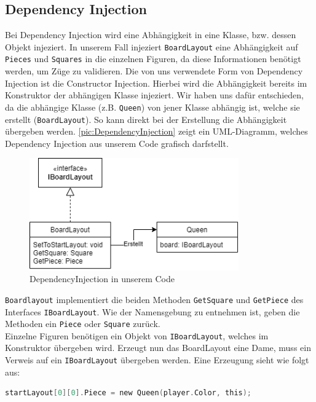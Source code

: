 \documentclass[
10pt, %
a4paper, %
oneside, %
headinclude,footinclude, %
BCOR5mm, %
]{scrartcl}
\begin{document}
\begin{onehalfspace}
\subsection{Dependency Injection}
\label{sec:depInjec}
Bei Dependency Injection wird eine Abhängigkeit in eine Klasse, bzw. dessen Objekt injeziert. In unserem Fall injeziert \texttt{BoardLayout} eine Abhängigkeit auf \texttt{Pieces} und \texttt{Squares} in die einzelnen Figuren, da diese Informationen benötigt werden, um Züge zu validieren. Die von uns verwendete Form von Dependency Injection ist die Constructor Injection. Hierbei wird die Abhängigkeit bereits im Konstruktor der abhängigen Klasse injeziert. Wir haben uns dafür entschieden, da die abhängige Klasse (z.B. \texttt{Queen}) von jener Klasse abhängig ist, welche sie erstellt (\texttt{BoardLayout}). So kann direkt bei der Erstellung die Abhängigkeit übergeben werden. \autoref{pic:DependencyInjection} zeigt ein UML-Diagramm, welches Dependency Injection aus unserem Code grafisch darfstellt.

\begin{figure}[h]
	\begin{center}
		\includegraphics[width=9cm]{DependencyInjection.png}
		\caption{\label{pic:DependencyInjection}DependencyInjection in unserem Code}
	\end{center}
\end{figure}

\texttt{Boardlayout} implementiert die beiden Methoden \texttt{GetSquare} und \texttt{GetPiece} des Interfaces \texttt{IBoardLayout}. Wie der Namensgebung zu entnehmen ist, geben die Methoden ein \texttt{Piece} oder \texttt{Square} zurück. \\
Einzelne Figuren benötigen ein Objekt von \texttt{IBoardLayout}, welches im Konstruktor übergeben wird. Erzeugt nun das BoardLayout eine Dame, muss ein Verweis auf ein \texttt{IBoardLayout} übergeben werden. Eine Erzeugung sieht wie folgt aus:

\begin{lstlisting}[language=c, style=mStyle]
startLayout[0][0].Piece = new Queen(player.Color, this);
\end{lstlisting}


\end{onehalfspace}
\end{document}
